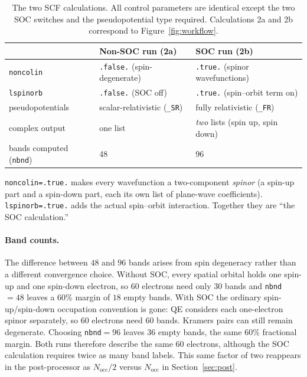 \documentclass[11pt]{article}
\newcommand{\Nocc}{N_{\mathrm{occ}}}
\begin{document}
\begin{table}[htbp]
\centering
\caption{The two SCF calculations. All control parameters are identical except the two SOC switches
and the pseudopotential type required. Calculations 2a and 2b correspond to
Figure~\ref{fig:workflow}.}\label{tab:tworuns}
\begin{tabular}{@{}lll@{}}
\toprule
 & \textbf{Non-SOC run (2a)} & \textbf{SOC run (2b)} \\
\midrule
\texttt{noncolin} & \texttt{.false.} (spin-degenerate) & \texttt{.true.} (spinor wavefunctions) \\
\texttt{lspinorb} & \texttt{.false.} (SOC off) & \texttt{.true.} (spin--orbit term on) \\
pseudopotentials  & scalar-relativistic (\texttt{\_SR}) & fully relativistic (\texttt{\_FR}) \\
complex output & one list & \emph{two} lists (spin up, spin down) \\
bands computed (\texttt{nbnd}) & 48 & 96 \\
\bottomrule
\end{tabular}
\end{table}

\texttt{noncolin=.true.} makes every wavefunction a two-component \emph{spinor} (a spin-up part and a
spin-down part, each its own list of plane-wave coefficients). \texttt{lspinorb=.true.} adds the
actual spin--orbit interaction. Together they are ``the SOC calculation.''

\paragraph{Band counts.} The difference between $48$ and $96$ bands arises from spin degeneracy rather than a
different convergence choice. Without SOC, every spatial orbital
holds one spin-up and one spin-down electron, so $60$ electrons need only $30$ bands and \texttt{nbnd}
$=48$ leaves a $60\%$ margin of $18$ empty bands. With SOC the ordinary spin-up/spin-down occupation
convention is gone: QE considers each one-electron spinor separately, so $60$ electrons need $60$
bands. Kramers pairs can still remain degenerate. Choosing \texttt{nbnd}$=96$ leaves $36$ empty
bands, the same $60\%$ fractional margin. Both runs therefore describe the same $60$ electrons,
although the SOC calculation requires twice as many band labels. This same factor of two reappears
in the post-processor as $\Nocc/2$ versus $\Nocc$ in
Section~\ref{sec:post}.
\end{document}
